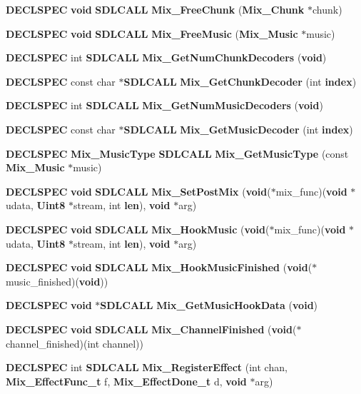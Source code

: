 \begin{DoxyCompactItemize}
\item 
{\bf D\+E\+C\+L\+S\+P\+E\+C} {\bf void} {\bf S\+D\+L\+C\+A\+L\+L} {\bf Mix\+\_\+\+Free\+Chunk} ({\bf Mix\+\_\+\+Chunk} $\ast$chunk)
\item 
{\bf D\+E\+C\+L\+S\+P\+E\+C} {\bf void} {\bf S\+D\+L\+C\+A\+L\+L} {\bf Mix\+\_\+\+Free\+Music} ({\bf Mix\+\_\+\+Music} $\ast$music)
\item 
{\bf D\+E\+C\+L\+S\+P\+E\+C} int {\bf S\+D\+L\+C\+A\+L\+L} {\bf Mix\+\_\+\+Get\+Num\+Chunk\+Decoders} ({\bf void})
\item 
{\bf D\+E\+C\+L\+S\+P\+E\+C} const char $\ast${\bf S\+D\+L\+C\+A\+L\+L} {\bf Mix\+\_\+\+Get\+Chunk\+Decoder} (int {\bf index})
\item 
{\bf D\+E\+C\+L\+S\+P\+E\+C} int {\bf S\+D\+L\+C\+A\+L\+L} {\bf Mix\+\_\+\+Get\+Num\+Music\+Decoders} ({\bf void})
\item 
{\bf D\+E\+C\+L\+S\+P\+E\+C} const char $\ast${\bf S\+D\+L\+C\+A\+L\+L} {\bf Mix\+\_\+\+Get\+Music\+Decoder} (int {\bf index})
\item 
{\bf D\+E\+C\+L\+S\+P\+E\+C} {\bf Mix\+\_\+\+Music\+Type} {\bf S\+D\+L\+C\+A\+L\+L} {\bf Mix\+\_\+\+Get\+Music\+Type} (const {\bf Mix\+\_\+\+Music} $\ast$music)
\item 
{\bf D\+E\+C\+L\+S\+P\+E\+C} {\bf void} {\bf S\+D\+L\+C\+A\+L\+L} {\bf Mix\+\_\+\+Set\+Post\+Mix} ({\bf void}($\ast$mix\+\_\+func)({\bf void} $\ast$udata, {\bf Uint8} $\ast$stream, int {\bf len}), {\bf void} $\ast$arg)
\item 
{\bf D\+E\+C\+L\+S\+P\+E\+C} {\bf void} {\bf S\+D\+L\+C\+A\+L\+L} {\bf Mix\+\_\+\+Hook\+Music} ({\bf void}($\ast$mix\+\_\+func)({\bf void} $\ast$udata, {\bf Uint8} $\ast$stream, int {\bf len}), {\bf void} $\ast$arg)
\item 
{\bf D\+E\+C\+L\+S\+P\+E\+C} {\bf void} {\bf S\+D\+L\+C\+A\+L\+L} {\bf Mix\+\_\+\+Hook\+Music\+Finished} ({\bf void}($\ast$music\+\_\+finished)({\bf void}))
\item 
{\bf D\+E\+C\+L\+S\+P\+E\+C} {\bf void} $\ast${\bf S\+D\+L\+C\+A\+L\+L} {\bf Mix\+\_\+\+Get\+Music\+Hook\+Data} ({\bf void})
\item 
{\bf D\+E\+C\+L\+S\+P\+E\+C} {\bf void} {\bf S\+D\+L\+C\+A\+L\+L} {\bf Mix\+\_\+\+Channel\+Finished} ({\bf void}($\ast$channel\+\_\+finished)(int channel))
\item 
{\bf D\+E\+C\+L\+S\+P\+E\+C} int {\bf S\+D\+L\+C\+A\+L\+L} {\bf Mix\+\_\+\+Register\+Effect} (int chan, {\bf Mix\+\_\+\+Effect\+Func\+\_\+t} f, {\bf Mix\+\_\+\+Effect\+Done\+\_\+t} d, {\bf void} $\ast$arg)
\item 

\end{DoxyCompactItemize}
